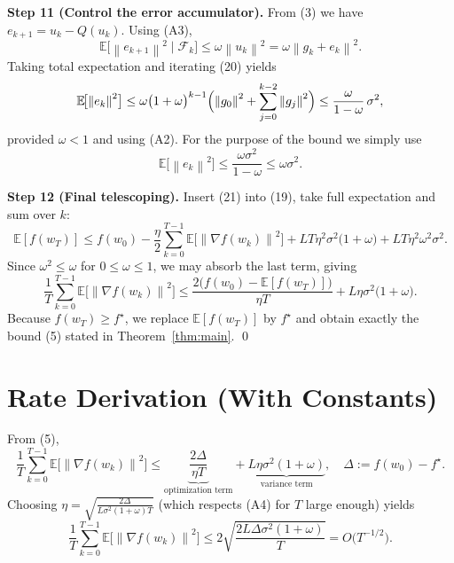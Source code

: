 \documentclass{article}
\newcommand{\E}{\mathbb{E}}
\newcommand{\norm}[1]{\left\|#1\right\|}
\begin{document}
\bigskip
\noindent\textbf{Step 11 (Control the error accumulator).}
From (3) we have $e_{k+1}=u_k-Q(u_k)$. Using (A3),
\[
\E\!\bigl[\norm{e_{k+1}}^{2}\mid\mathcal{F}_k\bigr]\le\omega\norm{u_k}^{2}
      =\omega\norm{g_k+e_k}^{2}. \tag{20}
\]
Taking total expectation and iterating (20) yields
\[
\E\!\bigl[\norm{e_k}^{2}\bigr]\le\omega\bigl(1+\omega\bigr)^{k-1}
      \Bigl(\norm{g_0}^{2}+\sum_{j=0}^{k-2}\norm{g_j}^{2}\Bigr)
      \le \frac{\omega}{1-\omega}\,\sigma^{2},
\]
provided $\omega<1$ and using (A2). For the purpose of the bound we simply use
\[
\E\!\bigl[\norm{e_k}^{2}\bigr]\le \frac{\omega\sigma^{2}}{1-\omega}\le \omega\sigma^{2}. \tag{21}
\]

\bigskip
\noindent\textbf{Step 12 (Final telescoping).}
Insert (21) into (19), take full expectation and sum over $k$:
\[
\E[f(w_T)]\le f(w_0)-\frac{\eta}{2}\sum_{k=0}^{T-1}\E\!\bigl[\norm{\nabla f(w_k)}^{2}\bigr]
      +LT\eta^{2}\sigma^{2}\bigl(1+\omega\bigr)
      +LT\eta^{2}\omega^{2}\sigma^{2}. \tag{22}
\]
Since $\omega^{2}\le\omega$ for $0\le\omega\le1$, we may absorb the last term,
giving
\[
\frac{1}{T}\sum_{k=0}^{T-1}\E\!\bigl[\norm{\nabla f(w_k)}^{2}\bigr]
\le \frac{2\bigl(f(w_0)-\E[f(w_T)]\bigr)}{\eta T}
   +L\eta\sigma^{2}\bigl(1+\omega\bigr). \tag{23}
\]
Because $f(w_T)\ge f^\star$, we replace $\E[f(w_T)]$ by $f^\star$ and obtain
exactly the bound (5) stated in Theorem~\ref{thm:main}. \hfill\qed

\section*{Rate Derivation (With Constants)}
From (5),
\[
\frac{1}{T}\sum_{k=0}^{T-1}\E\!\bigl[\norm{\nabla f(w_k)}^{2}\bigr]
\le \underbrace{\frac{2\Delta}{\eta T}}_{\text{optimization term}}
   +\underbrace{L\eta\sigma^{2}(1+\omega)}_{\text{variance term}},
\quad \Delta:=f(w_0)-f^\star .
\]
Choosing $\eta = \sqrt{\frac{2\Delta}{L\sigma^{2}(1+\omega)T}}$ (which respects (A4) for
$T$ large enough) yields
\[
\frac{1}{T}\sum_{k=0}^{T-1}\E\!\bigl[\norm{\nabla f(w_k)}^{2}\bigr]
\le 2\sqrt{\frac{2L\Delta\sigma^{2}(1+\omega)}{T}}
   = O\!\bigl(T^{-1/2}\bigr).
\]

\end{document}
